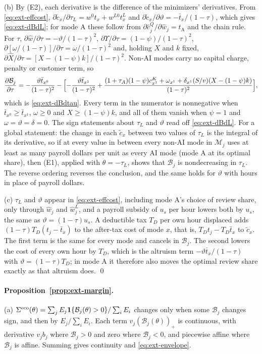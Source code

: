 (b) By (E2), each derivative is the difference of the minimizers' derivatives. From \eqref{eq:ext-effcost}, $\partial\tilde c_x/\partial\tau_L=w^0t_x+w^{L0}t^L_x$ and $\partial\tilde c_x/\partial\vartheta=-\bar t_x/(1-\tau)$, which gives \eqref{eq:ext-dBdL}; for mode A these follow from $\partial\hat c^Q_j/\partial\hat w_j=t_{\mathrm A}$ and the chain rule. For $\tau$, $\partial\hat w/\partial\tau=-\vartheta/(1-\tau)^2$, $\partial\Upsilon/\partial\tau=(1-\psi)/(1-\tau)^2$, $\partial[\omega/(1-\tau)]/\partial\tau=\omega/(1-\tau)^2$ and, holding $X$ and $k$ fixed, $\partial\hat X/\partial\tau=[X-(1-\psi)k]/(1-\tau)^2$. Non-AI modes carry no capital charge, penalty or customer term, so
\[
\frac{\partial\mathcal B_j}{\partial\tau}=-\frac{\vartheta\bar t_{x^0}}{(1-\tau)^2}-\Bigl[-\frac{\vartheta\bar t_{x^1}}{(1-\tau)^2}+\frac{(1+\tau_A)(1-\psi)c^K_{x^1}+\omega_{x^1}+\delta_{x^1}(S/v)(X-(1-\psi)k)}{(1-\tau)^2}\Bigr],
\]
which is \eqref{eq:ext-dBdtau}. Every term in the numerator is nonnegative when $\bar t_{x^0}\ge\bar t_{x^1}$, $\omega\ge0$ and $X\ge(1-\psi)k$, and all of them vanish when $\psi=1$ and $\omega=\vartheta=\delta=0$. The sign statements about $\tau_L$ and $\vartheta$ read off \eqref{eq:ext-dBdL}. For a global statement: the change in each $\tilde c_x$ between two values of $\tau_L$ is the integral of its derivative, so if at every value in between every non-AI mode in $\mathcal M_j$ uses at least as many payroll dollars per unit as every AI mode (mode A at its optimal share), then (E1), applied with $\theta=-\tau_L$, shows that $\mathcal B_j$ is nondecreasing in $\tau_L$. The reverse ordering reverses the conclusion, and the same holds for $\vartheta$ with hours in place of payroll dollars.

(c) $\tau_L$ and $\vartheta$ appear in \eqref{eq:ext-effcost}, including mode A's choice of review share, only through $\hat w_j$ and $\hat w^L_j$, and a payroll subsidy of $u_s$ per hour lowers both by $u_s$, the same as $\vartheta=(1-\tau)u_s$. A deductible tax $T_D$ per own hour displaced adds $(1-\tau)T_D(t_j-\bar t_x)$ to the after-tax cost of mode $x$, that is, $T_Dt_j-T_D\bar t_x$ to $\tilde c_x$. The first term is the same for every mode and cancels in $\mathcal B_j$. The second lowers the cost of every own hour by $T_D$, which is the altruism term $-\vartheta\bar t_x/(1-\tau)$ with $\vartheta=(1-\tau)T_D$; in mode A it therefore also moves the optimal review share exactly as that altruism does. \qed

\paragraph{Proposition~\ref{prop:ext-margin}.} (a) $\Sigma^{\rm eco}(\theta)=\sum_jE_j\mathbf 1\{\mathcal B_j(\theta)>0\}/\sum_iE_i$ changes only when some $\mathcal B_j$ changes sign, and then by $E_j/\sum_iE_i$. Each term $v_j(\mathcal B_j(\theta))_+$ is continuous, with derivative $v_jb_j$ where $\mathcal B_j>0$ and zero where $\mathcal B_j<0$, and piecewise affine where $\mathcal B_j$ is affine. Summing gives continuity and \eqref{eq:ext-envelope}.

